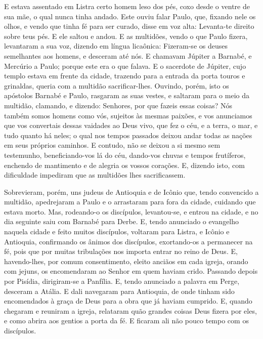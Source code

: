 E estava assentado em Listra certo homem leso dos pés, coxo desde
o ventre de sua mãe, o qual nunca tinha andado. Este ouviu falar
Paulo, que, fixando nele os olhos, e vendo que tinha fé para ser
curado, disse em voz alta: Levanta-te direito sobre teus pés.
E ele saltou e andou. E as multidões, vendo o que Paulo
fizera, levantaram a sua voz, dizendo em língua licaônica:
Fizeram-se os deuses semelhantes aos homens, e desceram até nós.
E chamavam Júpiter a Barnabé, e Mercúrio a Paulo; porque este
era o que falava. E o sacerdote de Júpiter, cujo templo
estava em frente da cidade, trazendo para a entrada da porta touros
e grinaldas, queria com a multidão sacrificar-lhes. Ouvindo,
porém, isto os apóstolos Barnabé e Paulo, rasgaram as suas vestes, e
saltaram para o meio da multidão, clamando, e dizendo:
Senhores, por que fazeis essas coisas? Nós também somos homens como
vós, sujeitos às mesmas paixões, e vos anunciamos que vos convertais
dessas vaidades ao Deus vivo, que fez o céu, e a terra, o mar, e
tudo quanto há neles; o qual nos tempos passados deixou andar
todas as nações em seus próprios caminhos. E contudo, não se
deixou a si mesmo sem testemunho, beneficiando-vos lá do céu,
dando-vos chuvas e tempos frutíferos, enchendo de mantimento e de
alegria os vossos corações. E, dizendo isto, com dificuldade
impediram que as multidões lhes sacrificassem.

Sobrevieram, porém, uns judeus de Antioquia e de Icônio que,
tendo convencido a multidão, apedrejaram a Paulo e o arrastaram para
fora da cidade, cuidando que estava morto. Mas, rodeando-o os
discípulos, levantou-se, e entrou na cidade, e no dia seguinte saiu
com Barnabé para Derbe. E, tendo anunciado o evangelho
naquela cidade e feito muitos discípulos, voltaram para Listra, e
Icônio e Antioquia, confirmando os ânimos dos discípulos,
exortando-os a permanecer na fé, pois que por muitas tribulações nos
importa entrar no reino de Deus. E, havendo-lhes, por comum
consentimento, eleito anciãos em cada igreja, orando com jejuns, os
encomendaram ao Senhor em quem haviam crido. Passando depois
por Pisídia, dirigiram-se a Panfília. E, tendo anunciado a
palavra em Perge, desceram a Atália. E dali navegaram para
Antioquia, de onde tinham sido encomendados à graça de Deus para a
obra que já haviam cumprido. E, quando chegaram e reuniram a
igreja, relataram quão grandes coisas Deus fizera por eles, e como
abrira aos gentios a porta da fé. E ficaram ali não pouco
tempo com os discípulos.

\medskip

